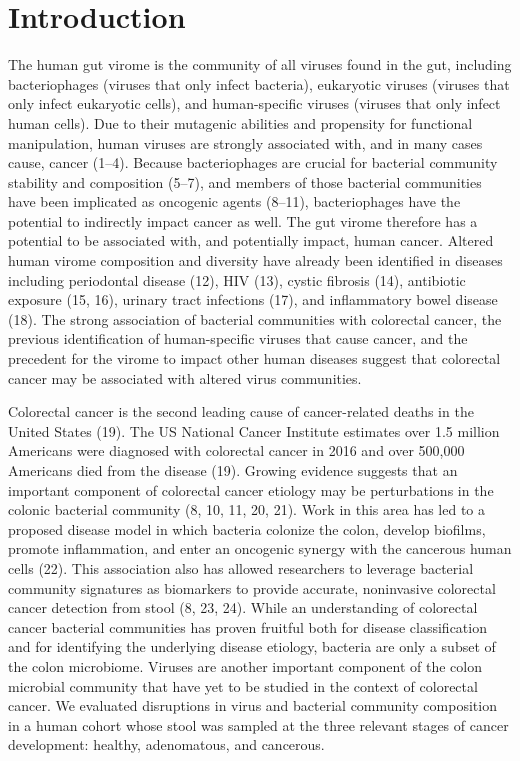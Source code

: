 \documentclass[12pt,]{article}
\begin{document}
\newpage

\section{Introduction}\label{introduction}

The human gut virome is the community of all viruses found in the gut,
including bacteriophages (viruses that only infect bacteria), eukaryotic
viruses (viruses that only infect eukaryotic cells), and human-specific
viruses (viruses that only infect human cells). Due to their mutagenic
abilities and propensity for functional manipulation, human viruses are
strongly associated with, and in many cases cause, cancer (1--4).
Because bacteriophages are crucial for bacterial community stability and
composition (5--7), and members of those bacterial communities have been
implicated as oncogenic agents (8--11), bacteriophages have the
potential to indirectly impact cancer as well. The gut virome therefore
has a potential to be associated with, and potentially impact, human
cancer. Altered human virome composition and diversity have already been
identified in diseases including periodontal disease (12), HIV (13),
cystic fibrosis (14), antibiotic exposure (15, 16), urinary tract
infections (17), and inflammatory bowel disease (18). The strong
association of bacterial communities with colorectal cancer, the
previous identification of human-specific viruses that cause cancer, and
the precedent for the virome to impact other human diseases suggest that
colorectal cancer may be associated with altered virus communities.

Colorectal cancer is the second leading cause of cancer-related deaths
in the United States (19). The US National Cancer Institute estimates
over 1.5 million Americans were diagnosed with colorectal cancer in 2016
and over 500,000 Americans died from the disease (19). Growing evidence
suggests that an important component of colorectal cancer etiology may
be perturbations in the colonic bacterial community (8, 10, 11, 20, 21).
Work in this area has led to a proposed disease model in which bacteria
colonize the colon, develop biofilms, promote inflammation, and enter an
oncogenic synergy with the cancerous human cells (22). This association
also has allowed researchers to leverage bacterial community signatures
as biomarkers to provide accurate, noninvasive colorectal cancer
detection from stool (8, 23, 24). While an understanding of colorectal
cancer bacterial communities has proven fruitful both for disease
classification and for identifying the underlying disease etiology,
bacteria are only a subset of the colon microbiome. Viruses are another
important component of the colon microbial community that have yet to be
studied in the context of colorectal cancer. We evaluated disruptions in
virus and bacterial community composition in a human cohort whose stool
was sampled at the three relevant stages of cancer development: healthy,
adenomatous, and cancerous.
\end{document}
